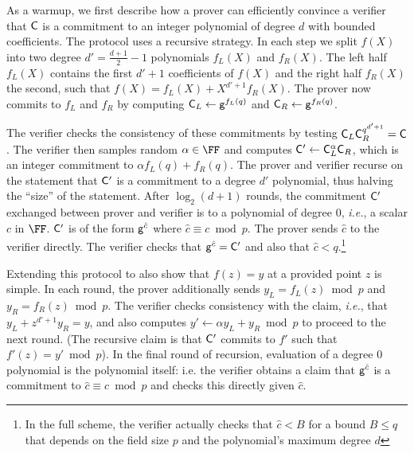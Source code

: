 As a warmup, we first describe how a prover can efficiently convince a verifier that $\mathsf{C}$ is a commitment to an integer polynomial of degree $d$ with bounded coefficients. The protocol uses a recursive strategy. 
In each step we split $f(X)$ into two degree $d'=\frac{d+1}{2}-1$ polynomials $f_L(X)$ and $f_R(X)$. 
The left half $f_L(X)$ contains the first $d'+1$ coefficients of $f(X)$ and the right half $f_R(X)$ the second, such that $f(X)=f_L(X)+X^{d'+1}f_R(X)$. The prover now commits to $f_L$ and $f_R$ by computing $\mathsf{C}_L\gets \mathsf{g}^{f_L(q)}$ and $\mathsf{C}_R\gets \mathsf{g}^{f_R(q)}$.
\begin{comment}
In our running example, $f_L(X)=4X+1$ and $f_R(X)=2X+3$. 
\end{comment} 
The verifier checks the consistency of these commitments by testing $\mathsf{C}_L\mathsf{C}_R^{q^{d'+1}}=\mathsf{C}$. The verifier then samples random  $\alpha \in \FF$ and computes $\mathsf{C}'\gets \mathsf{C}_L^{\alpha}\mathsf{C}_R$, which is an integer commitment to $\alpha f_L(q) + f_R(q)$. The prover and verifier recurse on the statement that $\mathsf{C}'$ is a commitment to a degree $d'$ polynomial, thus halving the ``size'' of the statement. %
After $\log_2(d+1)$ rounds, the commitment $\mathsf{C}'$ exchanged between prover and verifier is to a polynomial of degree $0$, \emph{i.e.}, a scalar $c$ in $\FF$. $\mathsf{C}'$ is of the form $\mathsf{g}^{\hat{c}}$ where $\hat{c} \equiv c \bmod p$. 
The prover sends $\hat{c}$ to the verifier directly. 
The verifier checks that $\mathsf{g}^{\hat{c}} = \mathsf{C}'$ and also that $\hat{c} < q$.\footnote{In the full scheme, the verifier actually checks that $\hat{c} < B$ for a bound $B \leq q$ that depends on the field size $p$ and the polynomial's maximum degree $d$} 

Extending this protocol to also show that $f(z) = y$ at a provided point $z$ is simple. 
In each round, the prover additionally sends $y_L=f_L(z)\bmod p$ and $y_R=f_R(z)\bmod p$. The verifier checks consistency with the claim, \emph{i.e.}, that $y_L+z^{d'+1}y_R=y$, and also computes $y' \leftarrow \alpha y_L+y_R\bmod p$ to proceed to the next round. (The recursive claim is that $\mathsf{C}'$ commits to $f'$ such that $f'(z) = y' \bmod p$). In the final round of recursion, evaluation of a degree $0$ polynomial is the polynomial itself: i.e. the verifier obtains a claim that $\mathsf{g}^{\hat{c}}$ is a commitment to $\hat{c} \equiv c \bmod p$ and checks this directly given $\hat{c}$. 

